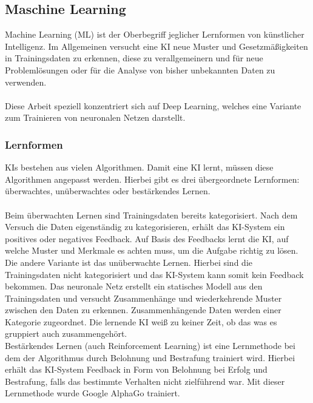 \documentclass[12pt,oneside,a4paper,parskip]{scrbook}
\begin{document}
\subsection{Maschine Learning}
Machine Learning (ML) ist der Oberbegriff jeglicher Lernformen von künstlicher Intelligenz. Im Allgemeinen versucht eine KI neue Muster und Gesetzmäßigkeiten in Trainingsdaten zu erkennen, diese zu verallgemeinern und für neue Problemlösungen oder für die Analyse von bisher unbekannten Daten zu verwenden\cite{EliminateHumanBias}.
\\\\Diese Arbeit speziell konzentriert sich auf Deep Learning, welches eine Variante zum Trainieren von neuronalen Netzen darstellt.
\subsubsection{Lernformen}
KIs bestehen aus vielen Algorithmen. Damit eine KI lernt, müssen diese Algorithmen angepasst werden. Hierbei gibt es drei übergeordnete Lernformen: überwachtes, unüberwachtes oder bestärkendes Lernen. \\\\
Beim überwachten Lernen sind Trainingsdaten bereits kategorisiert. Nach dem Versuch die Daten eigenständig zu kategorisieren, erhält das KI-System ein positives oder negatives Feedback. Auf Basis des Feedbacks lernt die KI, auf welche Muster und Merkmale es achten muss, um die Aufgabe richtig zu lösen. \\
Die andere Variante ist das unüberwachte Lernen. Hierbei sind die Trainingsdaten nicht kategorisiert und das KI-System kann somit kein Feedback bekommen. Das neuronale Netz erstellt ein statisches Modell aus den Trainingsdaten und versucht Zusammenhänge und wiederkehrende Muster zwischen den Daten zu erkennen. Zusammenhängende Daten werden einer Kategorie zugeordnet. Die lernende KI weiß zu keiner Zeit, ob das was es gruppiert auch zusammengehört.\\
Bestärkendes Lernen (auch Reinforcement Learning) ist eine Lernmethode bei dem der Algorithmus durch Belohnung und Bestrafung trainiert wird. Hierbei erhält das KI-System Feedback in Form von Belohnung bei Erfolg und Bestrafung, falls das bestimmte Verhalten nicht zielführend war. Mit dieser Lernmethode wurde Google AlphaGo trainiert.
\end{document}
